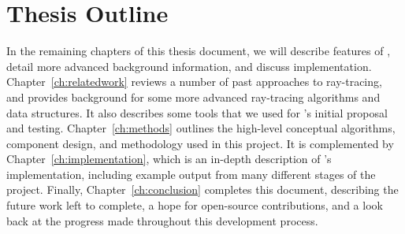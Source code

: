 \section{Thesis Outline}
\label{ch:intro:outline}

In the remaining chapters of this thesis document, we will describe features of \name{}, detail more advanced background information, and discuss implementation.
Chapter~\ref{ch:relatedwork} reviews a number of past approaches
to ray-tracing, and provides background for some more advanced ray-tracing algorithms and data structures.
It also describes some tools that we used for \name{}'s initial proposal and testing.
Chapter~\ref{ch:methods} outlines the high-level conceptual algorithms, component design, and methodology used in this project.
It is complemented by Chapter~\ref{ch:implementation}, which is an in-depth description of \name{}'s implementation, including example output from many different stages of the project.
Finally, Chapter~\ref{ch:conclusion} completes this document, describing the future work left to complete, a hope for open-source contributions, and a look back at the progress made throughout this development process.
